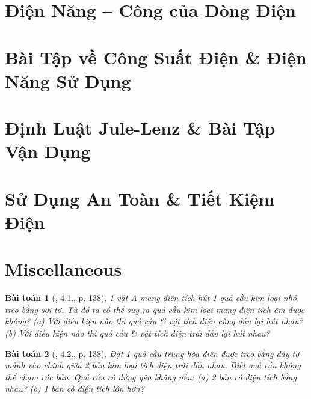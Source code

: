 \documentclass{article}
\newtheorem{baitoan}{Bài toán}
\begin{document}

\section{Điện Năng -- Công của Dòng Điện}


\section{Bài Tập về Công Suất Điện \& Điện Năng Sử Dụng}


\section{Định Luật Jule-Lenz \& Bài Tập Vận Dụng}


\section{Sử Dụng An Toàn \& Tiết Kiệm Điện}


\section{Miscellaneous}

\begin{baitoan}[\cite{Van_500_BT_Vat_Ly_THCS}, 4.1., p. 138]
	1 vật A mang điện tích hút 1 quả cầu kim loại nhỏ treo bằng sợi tơ. Từ đó ta có thể suy ra quả cầu kim loại mang điện tích âm được không? (a) Với điều kiện nào thì quả cầu \& vật tích điện cùng dấu lại hút nhau? (b) Với điều kiện nào thì quả cầu \& vật tích điện trái dấu lại hút nhau?
\end{baitoan}

\begin{baitoan}[\cite{Van_500_BT_Vat_Ly_THCS}, 4.2., p. 138]
	Đặt 1 quả cầu trung hòa điện được treo bằng dây tơ mảnh vào chính giữa 2 bản kim loại tích điện trái dấu nhau. Biết quả cầu không thể chạm các bản. Quả cầu có đứng yên không nếu: (a) 2 bản có điện tích bằng nhau? (b) 1 bản có điện tích lớn hơn?
\end{baitoan}
\end{document}
